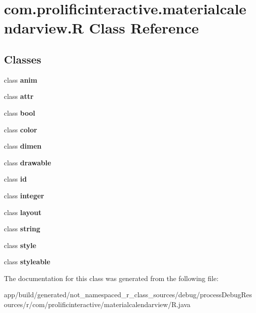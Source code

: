\hypertarget{classcom_1_1prolificinteractive_1_1materialcalendarview_1_1_r}{}\section{com.\+prolificinteractive.\+materialcalendarview.\+R Class Reference}
\label{classcom_1_1prolificinteractive_1_1materialcalendarview_1_1_r}
\subsection*{Classes}
\begin{DoxyCompactItemize}
\item 
class {\bfseries anim}
\item 
class {\bfseries attr}
\item 
class {\bfseries bool}
\item 
class {\bfseries color}
\item 
class {\bfseries dimen}
\item 
class {\bfseries drawable}
\item 
class {\bfseries id}
\item 
class {\bfseries integer}
\item 
class {\bfseries layout}
\item 
class {\bfseries string}
\item 
class {\bfseries style}
\item 
class {\bfseries styleable}
\end{DoxyCompactItemize}


The documentation for this class was generated from the following file\+:\begin{DoxyCompactItemize}
\item 
app/build/generated/not\+\_\+namespaced\+\_\+r\+\_\+class\+\_\+sources/debug/process\+Debug\+Resources/r/com/prolificinteractive/materialcalendarview/R.\+java\end{DoxyCompactItemize}
